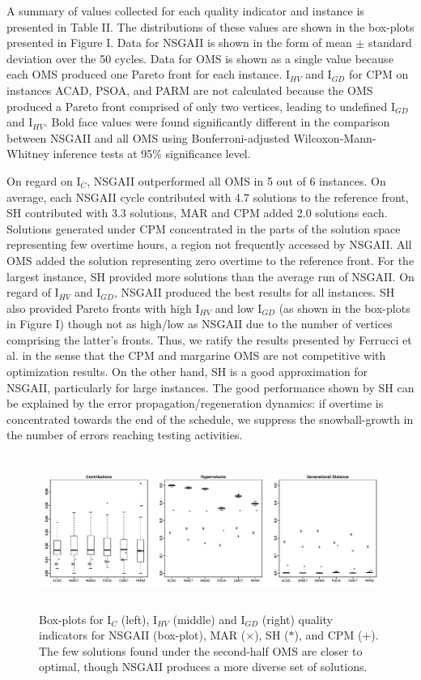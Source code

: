 \documentclass[conference]{IEEEtran}
\begin{document}
A summary of values collected for each quality indicator and instance is presented in Table II. The distributions of these values are shown in the box-plots presented in Figure I. Data for NSGAII is shown in the form of mean $\pm$ standard deviation over the 50 cycles. Data for OMS is shown as a single value because each OMS produced one Pareto front for each instance. I$_{HV}$ and I$_{GD}$ for CPM on instances ACAD, PSOA, and PARM are not calculated because the OMS produced a Pareto front comprised of only two vertices, leading to undefined I$_{GD}$ and I$_{HV}$. Bold face values were found significantly different in the comparison between NSGAII and all OMS using Bonferroni-adjusted Wilcoxon-Mann-Whitney inference tests at 95\% significance level. 

On regard on I$_{C}$, NSGAII outperformed all OMS in 5 out of 6 instances. On average, each NSGAII cycle contributed with 4.7 solutions to the reference front, SH contributed with 3.3 solutions, MAR and CPM added 2.0 solutions each. Solutions generated under CPM concentrated in the parts of the solution space representing few overtime hours, a region not frequently accessed by NSGAII. All OMS added the solution representing zero overtime to the reference front. For the largest instance, SH provided more solutions than the average run of NSGAII. On regard of I$_{HV}$ and I$_{GD}$, NSGAII produced the best results for all instances. SH also provided Pareto fronts with high I$_{HV}$ and low I$_{GD}$ (as shown in the box-plots in Figure I) though not as high/low as NSGAII due to the number of vertices comprising the latter's fronts. Thus, we ratify the results presented by Ferrucci et al. \cite{Ferrucci:2013} in the sense that the CPM and margarine OMS are not competitive with optimization results. On the other hand, SH is a good approximation for NSGAII, particularly for large instances. The good performance shown by SH can be explained by the error propagation/regeneration dynamics: if overtime is concentrated towards the end of the schedule, we suppress the snowball-growth in the number of errors reaching testing activities.

\begin{figure}
\centering
\includegraphics[width=18cm, height=5cm]{boxplots2.pdf}
\caption{Box-plots for I$_{C}$ (left), I$_{HV}$ (middle) and I$_{GD}$ (right) quality indicators for NSGAII (box-plot), MAR ($\times$), SH ($\ast$), and CPM (+). The few solutions found under the second-half OMS are closer to optimal, though NSGAII produces a more diverse set of solutions.}
\end{figure}
\end{document}
